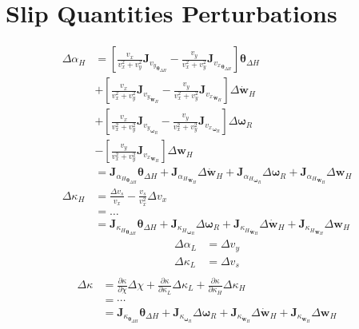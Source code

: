 \section{Slip Quantities Perturbations}
\begin{equation}
    \begin{split}
        \Delta \alpha_H &= \left[\frac{v_x}{v_x^2 + v_y^2} \mathbf{J}_{{v_y}_{\boldsymbol{\theta}_{\Delta H}}} - \frac{v_y}{v_x^2 + v_y^2}\mathbf{J}_{{v_x}_{\boldsymbol{\theta}_{\Delta H}}}\right] \boldsymbol{\theta}_{\Delta H}\\
        &+ \left[\frac{v_x}{v_x^2 + v_y^2} \mathbf{J}_{{v_y}_{\dot{\mathbf{w}}_H}} - \frac{v_y}{v_x^2 + v_y^2}\mathbf{J}_{{v_x}_{\dot{\mathbf{w}}_H}}\right] \Delta {\dot{\mathbf{w}}}_H\\
        &+ \left[\frac{v_x}{v_x^2 + v_y^2} \mathbf{J}_{{v_y}_{\boldsymbol{\omega}_R}} - \frac{v_y}{v_x^2 + v_y^2}\mathbf{J}_{{v_x}_{\boldsymbol{\omega}_R}}\right] \Delta \boldsymbol{\omega}_R\\
        &- \left[\frac{v_y}{v_x^2 + v_y^2}\mathbf{J}_{{v_x}_{{\mathbf{w}}_H}}\right] \Delta {\mathbf{w}}_H\\
        &= \mathbf{J}_{{\alpha_H}_{\boldsymbol{\theta}_{\Delta H}}}\boldsymbol{\theta}_{\Delta H} + \mathbf{J}_{{\alpha_H}_{\dot{\mathbf{w}}_H}}\Delta {\dot{\mathbf{w}}}_H + \mathbf{J}_{{\alpha_H}_{\boldsymbol{\omega}_R}}\Delta \boldsymbol{\omega}_R + \mathbf{J}_{{\alpha_H}_{\mathbf{w}_H}}\Delta {\mathbf{w}}_H\\
        \Delta \kappa_H &= \frac{\Delta v_s}{v_x} - \frac{v_s}{v_x^2}\Delta v_x\\
        &= \dots \\
        &= \mathbf{J}_{{\kappa_H}_{\boldsymbol{\theta}_{\Delta H}}}\boldsymbol{\theta}_{\Delta H} + \mathbf{J}_{{\kappa_H}_{\boldsymbol{\omega}_R}}\Delta \boldsymbol{\omega}_R + \mathbf{J}_{{\kappa_H}_{\dot{\mathbf{w}}_H}}\Delta {\dot{\mathbf{w}}}_H + \mathbf{J}_{{\kappa_H}_{\mathbf{w}_H}}\Delta {\mathbf{w}}_H
    \end{split}
\end{equation}
\begin{equation}
    \begin{split}
        \Delta \alpha_L &= \Delta v_y\\
        \Delta \kappa_L &= \Delta v_s\\
    \end{split}
\end{equation}
\begin{equation}
    \begin{split}
        \Delta \kappa &= \frac{\partial\kappa}{\partial\chi}\Delta\chi + \frac{\partial\kappa}{\partial\kappa_L}\Delta\kappa_L + \frac{\partial\kappa}{\partial\kappa_H}\Delta\kappa_H \\
        &= \cdots \\
        &= \mathbf{J}_{\kappa_{\boldsymbol{\theta}_{\Delta H}}}\boldsymbol{\theta}_{\Delta H} + \mathbf{J}_{\kappa_{\boldsymbol{\omega}_R}}\Delta \boldsymbol{\omega}_R + \mathbf{J}_{\kappa_{\dot{\mathbf{w}}_H}}\Delta {\dot{\mathbf{w}}}_H + \mathbf{J}_{\kappa_{\mathbf{w}_H}}\Delta {\mathbf{w}}_H
    \end{split}
\end{equation}
